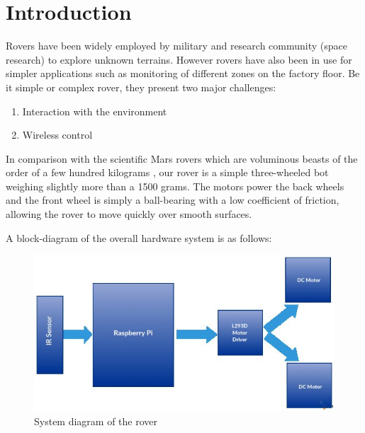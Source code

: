 \section{Introduction}

\begin{description}[font=\quad $\circ$, topsep=-2pt, itemsep=2pt]
	\item Rovers have been widely employed by military and research community (space research) to explore unknown terrains. However rovers have also been in use for simpler applications such as monitoring of different zones on the factory floor. Be it simple or complex rover, they present two major challenges:
	
	\begin{enumerate}[itemsep=0em]
		\item Interaction with the environment
		\item Wireless control
	\end{enumerate}
	
	\item In comparison with the scientific Mars rovers which are voluminous beasts of the order of a few hundred kilograms \cite{RobotSizes}, our rover is a simple three-wheeled bot weighing slightly more than a 1500 grams. The motors power the back wheels and the front wheel is simply a ball-bearing with a low coefficient of friction, allowing the rover to move quickly over smooth surfaces.

	\clearpage
	\quad A block-diagram of the overall hardware system is as follows:

	\begin{figure}[ht]	%
		\centering
		\includegraphics[width=\linewidth]{"./system_diagram.jpg"}
		\caption{System diagram of the rover}
		\label{fig:System Diagram}
	\end{figure}


\end{description}
